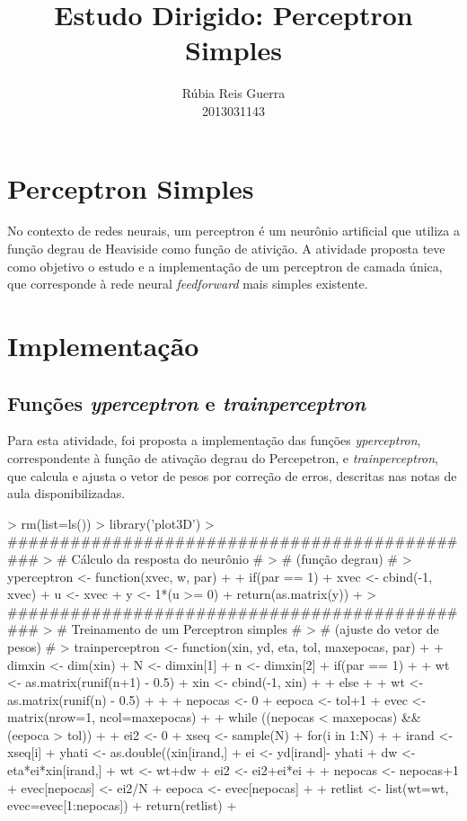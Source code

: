 \documentclass{article}
\title{Estudo Dirigido: Perceptron Simples}
\author{Rúbia Reis Guerra \\ 2013031143}
\begin{document}

\maketitle

\section{Perceptron Simples}
No contexto de redes neurais, um perceptron é um neurônio artificial que utiliza a função degrau de Heaviside como função de ativição. A atividade proposta teve como objetivo o estudo e a implementação de um perceptron de camada única, que corresponde à rede neural \textit{feedforward} mais simples existente.

\section{Implementação}

\subsection{Funções \textit{yperceptron} e \textit{trainperceptron}}
Para esta atividade, foi proposta a implementação das funções \textit{yperceptron}, correspondente à função de ativação degrau do Percepetron, e \textit{trainperceptron}, que calcula e ajusta o vetor de pesos por correção de erros, descritas nas notas de aula disponibilizadas.
\begin{Schunk}
\begin{Sinput}
> rm(list=ls())
> library('plot3D')
> ##############################################
> # Cálculo da resposta do neurônio #
> # (função degrau) #
> yperceptron <- function(xvec, w, par)
+ {
+   if(par == 1)
+     xvec <- cbind(-1, xvec)
+   u <- xvec %
+   y <- 1*(u >= 0)
+   return(as.matrix(y))
+ }
> ##############################################
> # Treinamento de um Perceptron simples #
> # (ajuste do vetor de pesos) #
> trainperceptron <- function(xin, yd, eta, tol, maxepocas, par)
+ {
+   dimxin <- dim(xin)
+   N <- dimxin[1]
+   n <- dimxin[2]
+   if(par == 1)
+   {
+     wt <- as.matrix(runif(n+1) - 0.5)
+     xin <- cbind(-1, xin)
+   }
+   else 
+   {
+     wt <- as.matrix(runif(n) - 0.5)
+   }
+   
+   nepocas <- 0
+   eepoca <- tol+1
+   evec <- matrix(nrow=1, ncol=maxepocas)
+   
+   while ((nepocas < maxepocas) && (eepoca > tol))
+   {
+     ei2 <- 0
+     xseq <- sample(N)
+     for(i in 1:N)
+     {
+       irand <- xseq[i]
+       yhati <- as.double((xin[irand,] %
+       ei <- yd[irand]- yhati
+       dw <- eta*ei*xin[irand,]
+       wt <- wt+dw
+       ei2 <- ei2+ei*ei
+     }
+     nepocas <- nepocas+1
+     evec[nepocas] <- ei2/N
+     eepoca <- evec[nepocas]
+   }
+   retlist <- list(wt=wt, evec=evec[1:nepocas])
+   return(retlist)
+ }
\end{Sinput}
\end{Schunk}
\end{document}
